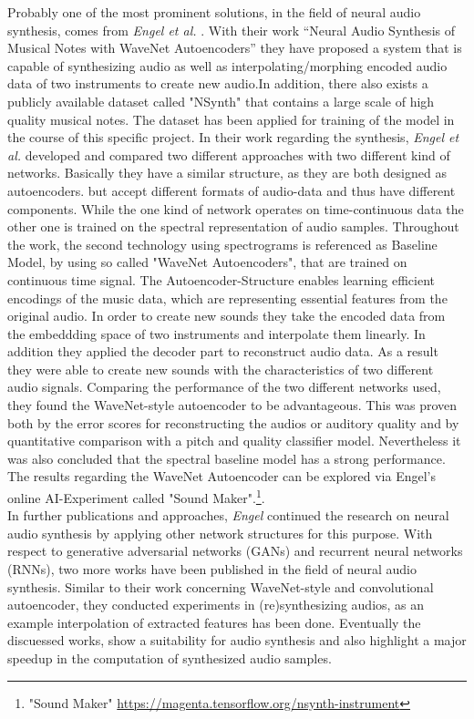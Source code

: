 Probably one of the most prominent solutions, in the field of neural audio synthesis, comes from \textit{Engel et al.} \cite{Engel2017}. With their work “Neural Audio Synthesis of Musical Notes with WaveNet Autoencoders” they have proposed a system that is capable of synthesizing audio as well as interpolating/morphing encoded audio data of two instruments to create new audio.In addition, there also exists a publicly available dataset called "NSynth" that contains a large scale of high quality musical notes. The dataset has been applied for training of the model in the course of this specific project. In their work regarding the synthesis, \textit{Engel et al.} developed and compared two different approaches with two different kind of networks. Basically they have a similar structure, as they are both designed as autoencoders. but accept different formats of audio-data and thus have different components. While the one kind of network operates on time-continuous data the other one is trained on the spectral representation of audio samples. Throughout the work, the second technology using spectrograms is referenced as Baseline Model, by using so called "WaveNet Autoencoders", that are trained on continuous time signal. The Autoencoder-Structure enables learning efficient encodings of the music data, which are representing essential features from the original audio. In order to create new sounds they take the encoded data from the embeddding space of two instruments and interpolate them linearly. In addition they applied the decoder part to reconstruct audio data. As a result they were able to create new sounds with the characteristics of two different audio signals. Comparing the performance of the two different networks used, they found the WaveNet-style autoencoder to be advantageous. This was proven both by the error scores for reconstructing the audios or auditory quality and by quantitative comparison with a pitch and quality classifier model. Nevertheless it was also concluded that the spectral baseline model has a strong performance.\\
The results regarding the WaveNet Autoencoder can be explored via Engel's online AI-Experiment called "Sound Maker".\footnote{"Sound Maker" \url{https://magenta.tensorflow.org/nsynth-instrument}}.\\

In further publications and approaches, \textit{Engel} continued the research on neural audio synthesis by applying other network structures for this purpose. With respect to generative adversarial networks (GANs) and recurrent neural networks (RNNs), two more works have been published in the field of neural audio synthesis. \cite{Engel2019, hantrakul2019fast} Similar to their work concerning WaveNet-style and convolutional autoencoder, they conducted experiments in (re)synthesizing audios, as an example interpolation of extracted features has been done. Eventually the discuessed works, show a suitability for audio synthesis and also highlight a major speedup in the computation of synthesized audio samples.\\

